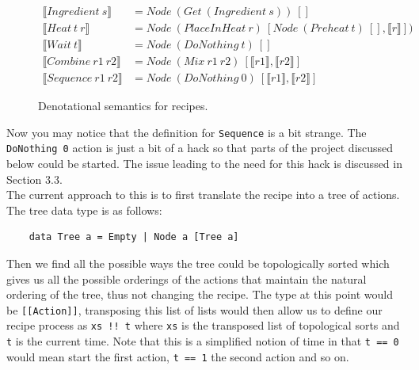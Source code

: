 \documentclass[11pt]{article}
\begin{document}
    \newpage

    \begin{figure}[ht]
        \centering\small
            \begin{align*}
            \llbracket Ingredient \: s \rrbracket &= Node \: (Get \: (Ingredient \: s)) \: [] \\
            \llbracket Heat \: t \: r \rrbracket &= Node \:(PlaceInHeat \: r) \:
                [Node \: (Preheat \: t) \: [], \llbracket r \rrbracket]) \\
            \llbracket Wait \: t \rrbracket &= Node \: (DoNothing \: t) \: [] \\
            \llbracket Combine \: r1 \: r2 \rrbracket &=
                Node \: (Mix \: r1 \: r2) \: [\llbracket r1 \rrbracket , \llbracket r2 \rrbracket] \\
            \llbracket Sequence \: r1 \: r2 \rrbracket &=
                Node \: (DoNothing \: 0) \: [\llbracket r1 \rrbracket , \llbracket r2 \rrbracket]
            \end{align*}
        \caption{Denotational semantics for recipes.}
    \end{figure}

    Now you may notice that the definition for \texttt{Sequence} is a bit strange. The
    \texttt{DoNothing 0} action is just a bit of a hack so that parts of the project
    discussed below could be started. The issue leading to the need for this hack
    is discussed in Section 3.3. \\
        
    The current approach to this is to first translate the recipe into a tree of actions.
    The tree data type is as follows: \\
    \begin{tt}
    \small
    \begin{lstlisting}
    data Tree a = Empty | Node a [Tree a]
    \end{lstlisting}
    \end{tt}

    Then we find all the possible ways the tree could be topologically sorted which
    gives us all the possible orderings of the actions that maintain the natural
    ordering of the tree, thus not changing the recipe. The type at this point would
    be \texttt{[[Action]]}, transposing this list of lists would then allow us to
    define our recipe process as \texttt{xs !! t} where \texttt{xs} is the transposed
    list of topological sorts and \texttt{t} is the current time. Note that this
    is a simplified notion of time in that \texttt{t == 0} would mean start the first
    action, \texttt{t == 1} the second action and so on.
\end{document}
